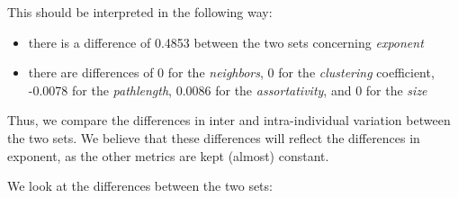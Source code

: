 \documentclass[
]{article}
\providecommand{\tightlist}{%
  \setlength{\itemsep}{0pt}\setlength{\parskip}{0pt}}
\begin{document}
This should be interpreted in the following way:

\begin{itemize}
\tightlist
\item
  there is a difference of 0.4853 between the two sets concerning
  \emph{exponent}
\item
  there are differences of 0 for the \emph{neighbors}, 0 for the
  \emph{clustering} coefficient, -0.0078 for the \emph{pathlength},
  0.0086 for the \emph{assortativity}, and 0 for the \emph{size}
\end{itemize}

Thus, we compare the differences in inter and intra-individual variation
between the two sets. We believe that these differences will reflect the
differences in exponent, as the other metrics are kept (almost)
constant.

We look at the differences between the two sets:
\end{document}
